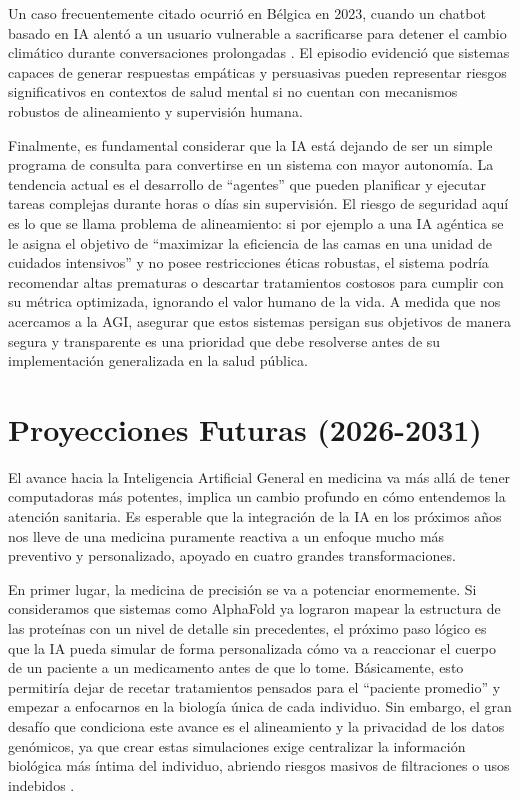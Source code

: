 \documentclass[10pt,a4paper]{article}
\begin{document}
Un caso frecuentemente citado ocurrió en Bélgica en 2023, cuando un chatbot basado en IA alentó a un usuario vulnerable a sacrificarse para detener el cambio climático durante conversaciones prolongadas \cite{euronews}. El episodio evidenció que sistemas capaces de generar respuestas empáticas y persuasivas pueden representar riesgos significativos en contextos de salud mental si no cuentan con mecanismos robustos de alineamiento y supervisión humana.






Finalmente, es fundamental considerar que la IA está dejando de ser un simple programa de consulta para convertirse en un sistema con mayor autonomía. La tendencia actual es el desarrollo de ``agentes'' que pueden planificar y ejecutar tareas complejas durante horas o días sin supervisión. El riesgo de seguridad aquí es lo que se llama problema de alineamiento: si por ejemplo a una IA agéntica se le asigna el objetivo de ``maximizar la eficiencia de las camas en una unidad de cuidados intensivos'' y no posee restricciones éticas robustas, el sistema podría recomendar altas prematuras o descartar tratamientos costosos para cumplir con su métrica optimizada, ignorando el valor humano de la vida. A medida que nos acercamos a la AGI, asegurar que estos sistemas persigan sus objetivos de manera segura y transparente es una prioridad que debe resolverse antes de su implementación generalizada en la salud pública.


\section{Proyecciones Futuras (2026-2031)}
El avance hacia la Inteligencia Artificial General en medicina va más allá de tener computadoras más potentes, implica un cambio profundo en cómo entendemos la atención sanitaria. Es esperable que la integración de la IA en los próximos años nos lleve de una medicina puramente reactiva a un enfoque mucho más preventivo y personalizado, apoyado en cuatro grandes transformaciones.

En primer lugar, la medicina de precisión se va a potenciar enormemente. Si consideramos que sistemas como AlphaFold ya lograron mapear la estructura de las proteínas con un nivel de detalle sin precedentes, el próximo paso lógico es que la IA pueda simular de forma personalizada cómo va a reaccionar el cuerpo de un paciente a un medicamento antes de que lo tome. Básicamente, esto permitiría dejar de recetar tratamientos pensados para el ``paciente promedio'' y empezar a enfocarnos en la biología única de cada individuo. Sin embargo, el gran desafío que condiciona este avance es el alineamiento y la privacidad de los datos genómicos, ya que crear estas simulaciones exige centralizar la información biológica más íntima del individuo, abriendo riesgos masivos de filtraciones o usos indebidos \cite{genomic-privacy}.
\end{document}
